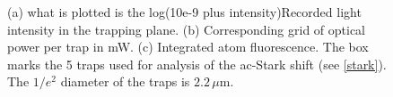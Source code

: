 \documentclass[../Thesis-IJspeert.tex]{subfiles}
\begin{document}
\begin{figure}[t]
\begin{subfigure}[b]{.23\linewidth}
	\centering
	\caption{}
	\label{c}
\end{subfigure}
\begin{subfigure}[b]{.23\linewidth}
	\centering
	\caption{}
	\label{c}
\end{subfigure}
	\caption{(a) what is plotted is the log(10e-9 plus intensity)Recorded light intensity in the trapping plane. (b) Corresponding grid of optical power per trap in mW. (c) Integrated atom fluorescence. The box marks the 5 traps used for analysis of the ac-Stark shift (see \autoref{stark}). The $1/e^2$ diameter of the traps is $2.2\,\mu$m.}
\end{figure}
\end{document}
